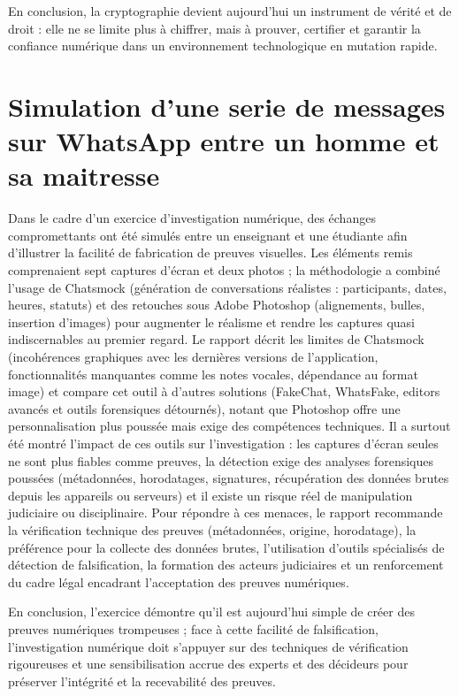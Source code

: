 \documentclass[11pt,a4paper]{article}
\begin{document}
	En conclusion, la cryptographie devient aujourd’hui un instrument de vérité et de droit : elle ne se limite plus à chiffrer, mais à prouver, certifier et garantir la confiance numérique dans un environnement technologique en mutation rapide.
	
	
	
	
	
	\section{ Simulation d'une serie de messages sur
		WhatsApp entre un homme et sa maitresse}
	\vspace{0.5cm}
 
Dans le cadre d’un exercice d’investigation numérique, des échanges compromettants ont été simulés entre un enseignant et une étudiante afin d’illustrer la facilité de fabrication de preuves visuelles. Les éléments remis comprenaient sept captures d’écran et deux photos ; la méthodologie a combiné l’usage de Chatsmock (génération de conversations réalistes : participants, dates, heures, statuts) et des retouches sous Adobe Photoshop (alignements, bulles, insertion d’images) pour augmenter le réalisme et rendre les captures quasi indiscernables au premier regard. Le rapport décrit les limites de Chatsmock (incohérences graphiques avec les dernières versions de l’application, fonctionnalités manquantes comme les notes vocales, dépendance au format image) et compare cet outil à d’autres solutions (FakeChat, WhatsFake, editors avancés et outils forensiques détournés), notant que Photoshop offre une personnalisation plus poussée mais exige des compétences techniques. Il a surtout été montré l’impact de ces outils sur l’investigation : les captures d’écran seules ne sont plus fiables comme preuves, la détection exige des analyses forensiques poussées (métadonnées, horodatages, signatures, récupération des données brutes depuis les appareils ou serveurs) et il existe un risque réel de manipulation judiciaire ou disciplinaire. Pour répondre à ces menaces, le rapport recommande la vérification technique des preuves (métadonnées, origine, horodatage), la préférence pour la collecte des données brutes, l’utilisation d’outils spécialisés de détection de falsification, la formation des acteurs judiciaires et un renforcement du cadre légal encadrant l’acceptation des preuves numériques. 

En conclusion, l’exercice démontre qu’il est aujourd’hui simple de créer des preuves numériques trompeuses ; face à cette facilité de falsification, l’investigation numérique doit s’appuyer sur des techniques de vérification rigoureuses et une sensibilisation accrue des experts et des décideurs pour préserver l’intégrité et la recevabilité des preuves.
\end{document}
